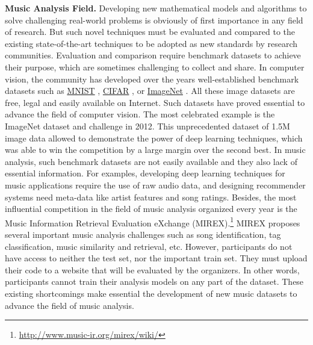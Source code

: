 \documentclass{article}
\begin{document}
\noindent
{\bf Music Analysis Field.} Developing new mathematical models and algorithms to solve challenging real-world problems is obviously of first importance in any field of research. But such novel techniques must be evaluated and compared to the existing state-of-the-art techniques to be adopted as new standards by research communities. Evaluation and comparison require benchmark datasets to achieve their purpose, which are sometimes challenging to collect and share. In computer vision, the community has developed over the years well-established benchmark datasets such as \href{http://yann.lecun.com/exdb/mnist/}{MNIST} \cite{mnist}, \href{https://www.cs.toronto.edu/~kriz/cifar.html}{CIFAR} \cite{cifar}, or \href{http://www.image-net.org}{ImageNet} \cite{imagenet}. All these image datasets are free, legal and easily available on Internet. Such datasets have proved essential to advance the field of computer vision. The most celebrated example is the ImageNet dataset and challenge in 2012. This unprecedented dataset of 1.5M image data allowed to demonstrate the power of deep learning techniques, which was able to win the competition by a large margin over the second best. In music analysis, such benchmark datasets are not easily available and they also lack of essential information. For examples, developing deep learning techniques for music applications require the use of raw audio data, and designing recommender systems need meta-data like artist features and song ratings. Besides, the most influential competition in the field of music analysis organized every year is the Music Information Retrieval Evaluation eXchange (MIREX).\footnote{\url{http://www.music-ir.org/mirex/wiki/}} MIREX proposes several important music analysis challenges such as song identification, tag classification, music similarity and retrieval, etc. However, participants do not have access to neither the test set, nor the important train set. They must upload their code to a website that will be evaluated by the organizers. In other words, participants cannot train their analysis models on any part of the dataset. These existing shortcomings make essential the development of new music datasets to advance the field of music analysis.   \\
\end{document}
